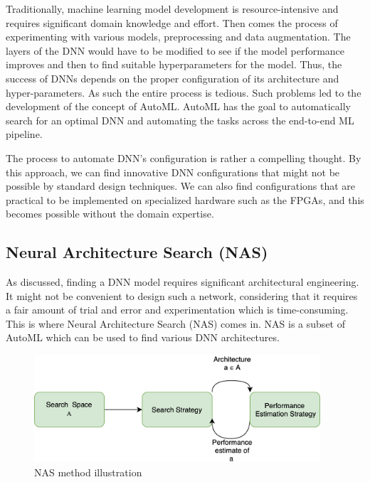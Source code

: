 Traditionally, machine learning model development is resource-intensive and requires significant domain knowledge and effort. Then comes the process of experimenting with various models, preprocessing and data augmentation. The layers of the DNN would have to be modified to see if the model performance improves and then to find suitable hyperparameters for the model. Thus, the success of DNNs depends on the proper configuration of its architecture and hyper-parameters. As such the entire process is tedious. Such problems led to the development of the concept of AutoML. AutoML has the goal to automatically search for an optimal DNN and automating the tasks across the end-to-end ML pipeline.

The process to automate DNN's configuration is rather a compelling thought. By this approach, we can find innovative DNN configurations that might not be possible by standard design techniques. We can also find configurations that are practical to be implemented on specialized hardware such as the FPGAs, and this becomes possible without the domain expertise.

\subsection{Neural Architecture Search (NAS)}

As discussed, finding a DNN model requires significant architectural engineering. It might not be convenient to design such a network, considering that it requires a fair amount of trial and error and experimentation which is time-consuming. This is where Neural Architecture Search (NAS) comes in. NAS is a subset of AutoML which can be used to find various DNN architectures.

\begin{figure}[ht]
    \centering
    \includegraphics[width=1.0\linewidth, height=4cm]{BachelorMasterThesis/TheoreticalBackground/Figures/NAS_strategy.png}
    \caption{NAS method illustration \cite{elsken2018neural}}
    \label{fig:nas_method_illustration}
\end{figure}

